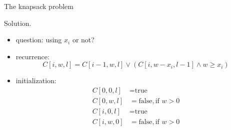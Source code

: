 \begin{frame}{The knapsack problem}
  \begin{block}{Solution.}
    \begin{itemize}
      \item question: using $x_{i}$ or not?
      \item recurrence: 
	\[
	  C[i,w,l] = C[i-1,w,l] \lor \left( C[i,w-x_{i},l-1] \land w \ge x_{i} \right)
	\]
      \item initialization:
	\begin{align*}
	  C[0,0,l] &= \text{true} \\
	  C[0,w,l] &= \text{false}, \text{if } w > 0 \\
	  C[i,0,l] &= \text{true} \\
	  C[i,w,0] &= \text{false}, \text{if } w > 0
	\end{align*}
    \end{itemize}
  \end{block}
\end{frame}
